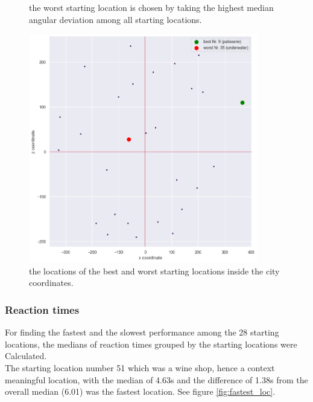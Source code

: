 \begin{figure}[!h]
	\caption[Worst starting location based on angular deviation]{the worst starting location is chosen by taking the highest median angular deviation among all starting locations.}
\end{figure}
\label{fig:worst_location}

\begin{figure}[h]
	\centering
	\includegraphics[width=100mm]{figures/best_worst_starting_locations.png}
	\caption[Locations of best and worst starting locations in city]{the locations of the best and worst starting locations inside the city coordinates.}
	\label{fig:best_worst_locs}
\end{figure}


\subsubsection{Reaction times}

For finding the fastest and the slowest performance among the 28 starting locations, the medians of reaction times grouped by the starting locations were Calculated.\\
The starting location number 51 which was a wine shop, hence a context meaningful location, with the median of 4.63s and the difference of 1.38s from the overall median (6.01) was the fastest location. See figure \ref{fig:fastest_loc}.\\

